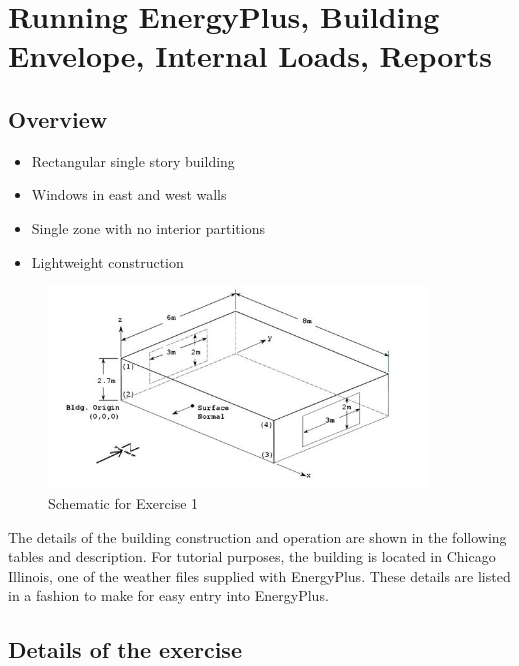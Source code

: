 \section{Running EnergyPlus, Building Envelope, Internal Loads, Reports}\label{running-energyplus-building-envelope-internal-loads-reports}

\subsection{Overview}\label{overview}

\begin{itemize}
\item
  Rectangular single story building
\item
  Windows in east and west walls
\item
  Single zone with no interior partitions
\item
  Lightweight construction
\end{itemize}

\begin{figure}[hbtp] %
\centering
\includegraphics[width=0.9\textwidth, height=0.9\textheight, keepaspectratio=true]{media/image011.jpg}
\caption{Schematic for Exercise 1 \protect \label{fig:schematic-for-exercise-1}}
\end{figure}

The details of the building construction and operation are shown in the following tables and description. For tutorial purposes, the building is located in Chicago Illinois, one of the weather files supplied with EnergyPlus. These details are listed in a fashion to make for easy entry into EnergyPlus.

\subsection{Details of the exercise}\label{details-of-the-exercise}

